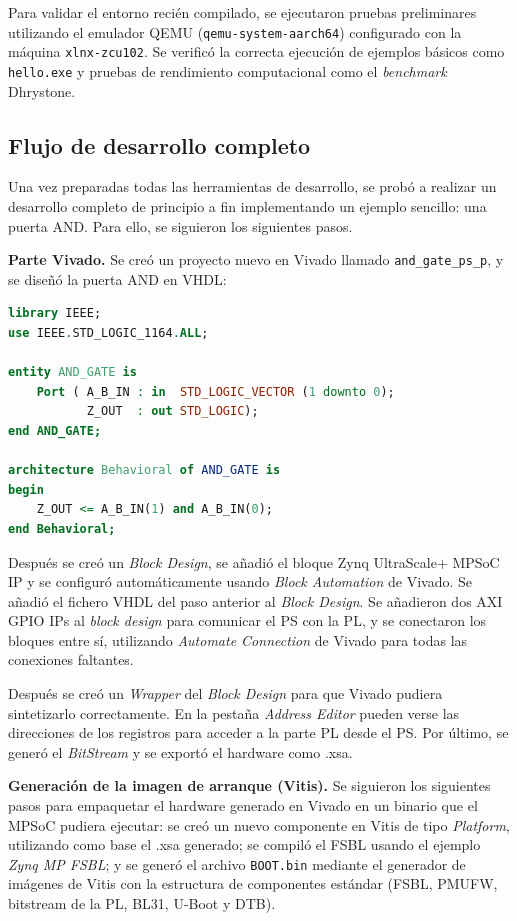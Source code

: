 Para validar el entorno recién compilado, se ejecutaron pruebas preliminares utilizando el
emulador QEMU (\texttt{qemu-system-aarch64}) configurado con la máquina
\texttt{xlnx-zcu102}. Se verificó la correcta ejecución de ejemplos básicos como
\texttt{hello.exe} y pruebas de rendimiento computacional como el \textit{benchmark} Dhrystone.

\subsection{Flujo de desarrollo completo}

Una vez preparadas todas las herramientas de desarrollo, se probó a realizar un desarrollo
completo de principio a fin implementando un ejemplo sencillo: una puerta AND. Para ello, se
siguieron los siguientes pasos.

\textbf{Parte Vivado.} Se creó un proyecto nuevo en Vivado llamado \texttt{and\_gate\_ps\_p}, y se
diseñó la puerta AND en VHDL:

\begin{lstlisting}[language=VHDL, caption={AND\_GATE.vhd --- ejemplo de puerta AND en VHDL}]
library IEEE;
use IEEE.STD_LOGIC_1164.ALL;

entity AND_GATE is
    Port ( A_B_IN : in  STD_LOGIC_VECTOR (1 downto 0);
           Z_OUT  : out STD_LOGIC);
end AND_GATE;

architecture Behavioral of AND_GATE is
begin
    Z_OUT <= A_B_IN(1) and A_B_IN(0);
end Behavioral;
\end{lstlisting}

Después se creó un \textit{Block Design}, se añadió el bloque Zynq UltraScale+ MPSoC IP y se
configuró automáticamente usando \textit{Block Automation} de Vivado. Se añadió el fichero VHDL
del paso anterior al \textit{Block Design}. Se añadieron dos AXI GPIO IPs al \textit{block design} para
comunicar el PS con la PL, y se conectaron los bloques entre sí, utilizando \textit{Automate
Connection} de Vivado para todas las conexiones faltantes.

Después se creó un \textit{Wrapper} del \textit{Block Design} para que Vivado pudiera sintetizarlo
correctamente. En la pestaña \textit{Address Editor} pueden verse las direcciones de los registros
para acceder a la parte PL desde el PS. Por último, se generó el \textit{BitStream} y se exportó el
hardware como .xsa.

\textbf{Generación de la imagen de arranque (Vitis).} Se siguieron los siguientes pasos para
empaquetar el hardware generado en Vivado en un binario que el MPSoC pudiera ejecutar:
se creó un nuevo componente en Vitis de tipo \textit{Platform}, utilizando como base el .xsa
generado; se compiló el FSBL usando el ejemplo \textit{Zynq MP FSBL}; y se generó el archivo
\texttt{BOOT.bin} mediante el generador de imágenes de Vitis con la estructura de componentes
estándar (FSBL, PMUFW, bitstream de la PL, BL31, U-Boot y DTB).

